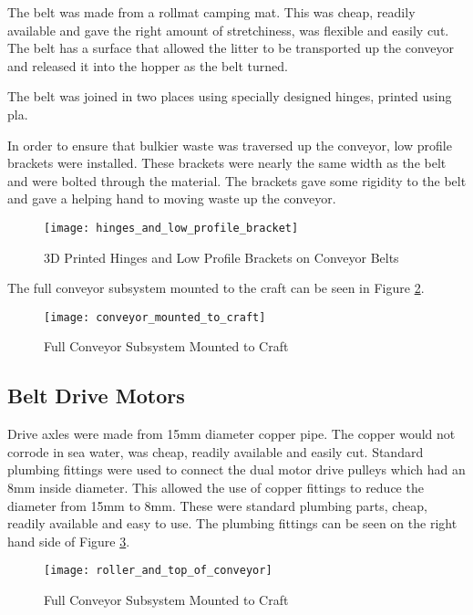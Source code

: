 \documentclass [12pt]{article}
\begin{document}
The belt was made from a \gls{rollmat} camping mat. This was cheap, readily available and gave the right amount of stretchiness, was flexible and easily cut. The belt has a surface that allowed the litter to be transported up the conveyor and released it into the hopper as the belt turned. 

The belt was joined in two places using specially designed hinges, printed using \gls{pla}.

In order to ensure that bulkier waste was traversed up the conveyor, low profile brackets were installed. These brackets were nearly the same width as the belt and were bolted through the material. The brackets gave some rigidity to the belt and gave a helping hand to moving waste up the conveyor.

\begin{figure}[H]
\centerline{\texttt{[image: hinges\_and\_low\_profile\_bracket]}}
\caption{3D Printed Hinges and Low Profile Brackets on Conveyor Belts}
\label{fig:hinges_and_low_profile_bracket}
\end{figure}

The full conveyor subsystem mounted to the craft can be seen in Figure \ref{fig:conveyor_mounted_to_craft}.

\begin{figure}[H]
\centerline{\texttt{[image: conveyor\_mounted\_to\_craft]}}
\caption{Full Conveyor Subsystem Mounted to Craft}
\label{fig:conveyor_mounted_to_craft}
\end{figure}

\subsection{Belt Drive Motors}

Drive axles were made from 15mm diameter copper pipe. The copper would not corrode in sea water, was cheap, readily available and easily cut. Standard plumbing fittings were used to connect the dual motor drive pulleys which had an 8mm inside diameter. This allowed the use of copper fittings to reduce the diameter from 15mm to 8mm. These were standard plumbing parts, cheap, readily available and easy to use. The plumbing fittings can be seen on the right hand side of Figure \ref{fig:roller_and_top_of_conveyor}.

\begin{figure}[H]
\centerline{\texttt{[image: roller\_and\_top\_of\_conveyor]}}
\caption{Full Conveyor Subsystem Mounted to Craft}
\label{fig:roller_and_top_of_conveyor}
\end{figure}
\end{document}
